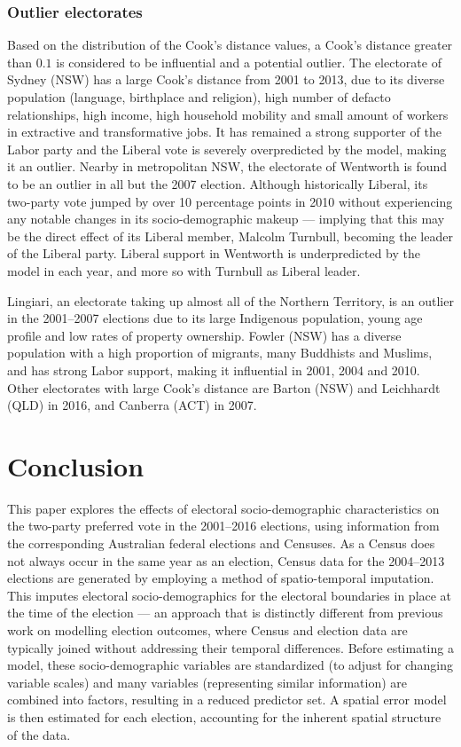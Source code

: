 \documentclass[11pt,a4paper,]{article}
\begin{document}
\hypertarget{outlier-electorates}{%
\subsubsection{Outlier electorates}\label{outlier-electorates}}

Based on the distribution of the Cook's distance values, a Cook's distance greater than \(0.1\) is considered to be influential and a potential outlier. The electorate of Sydney (NSW) has a large Cook's distance from 2001 to 2013, due to its diverse population (language, birthplace and religion), high number of defacto relationships, high income, high household mobility and small amount of workers in extractive and transformative jobs. It has remained a strong supporter of the Labor party and the Liberal vote is severely overpredicted by the model, making it an outlier. Nearby in metropolitan NSW, the electorate of Wentworth is found to be an outlier in all but the 2007 election. Although historically Liberal, its two-party vote jumped by over 10 percentage points in 2010 without experiencing any notable changes in its socio-demographic makeup --- implying that this may be the direct effect of its Liberal member, Malcolm Turnbull, becoming the leader of the Liberal party. Liberal support in Wentworth is underpredicted by the model in each year, and more so with Turnbull as Liberal leader.

Lingiari, an electorate taking up almost all of the Northern Territory, is an outlier in the 2001--2007 elections due to its large Indigenous population, young age profile and low rates of property ownership. Fowler (NSW) has a diverse population with a high proportion of migrants, many Buddhists and Muslims, and has strong Labor support, making it influential in 2001, 2004 and 2010. Other electorates with large Cook's distance are Barton (NSW) and Leichhardt (QLD) in 2016, and Canberra (ACT) in 2007.

\hypertarget{conclusion}{%
\section{Conclusion}\label{conclusion}}

This paper explores the effects of electoral socio-demographic characteristics on the two-party preferred vote in the 2001--2016 elections, using information from the corresponding Australian federal elections and Censuses. As a Census does not always occur in the same year as an election, Census data for the 2004--2013 elections are generated by employing a method of spatio-temporal imputation. This imputes electoral socio-demographics for the electoral boundaries in place at the time of the election --- an approach that is distinctly different from previous work on modelling election outcomes, where Census and election data are typically joined without addressing their temporal differences. Before estimating a model, these socio-demographic variables are standardized (to adjust for changing variable scales) and many variables (representing similar information) are combined into factors, resulting in a reduced predictor set. A spatial error model is then estimated for each election, accounting for the inherent spatial structure of the data.
\end{document}
